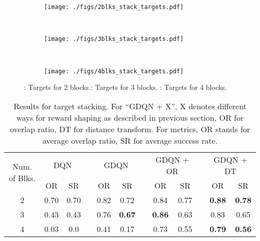 \documentclass{article} %
\begin{document}
\begin{figure}
    \centering
    \begin{subfigure}[b]{0.32\linewidth}
        \texttt{[image: ./figs/2blks\_stack\_targets.pdf]}
        \caption{}
        \label{fig:2blks_tgt_stack}
    \end{subfigure}
    ~ 
    \begin{subfigure}[b]{0.32\linewidth}
        \texttt{[image: ./figs/3blks\_stack\_targets.pdf]}
        \caption{}
        \label{fig:3blks_tgt_stack}
    \end{subfigure}
    ~ 
    \begin{subfigure}[b]{0.32\linewidth}
        \texttt{[image: ./figs/4blks\_stack\_targets.pdf]}
        \caption{}
        \label{fig:4blks_tgt_stack}
    \end{subfigure}
    \caption{\protect{}: Targets for $2$ blocks.\protect{}: Targets for $3$ blocks. \protect{}: Targets for $4$ blocks.}
    \label{fig:tgt_stack}
\end{figure}\begin{table}
\centering
\begin{tabular}{@{}clccccccccccc@{}}
\toprule
\multicolumn{2}{c}{\multirow{2}{*}{Num. of Blks.}} & \multicolumn{2}{c}{DQN} &  & \multicolumn{2}{c}{GDQN} &  & \multicolumn{2}{c}{GDQN + OR} &  & \multicolumn{2}{c}{GDQN + DT} \\ \cmidrule(lr){3-4} \cmidrule(lr){6-7} \cmidrule(lr){9-10} \cmidrule(l){12-13} 
\multicolumn{2}{c}{}                               & OR         & SR         &  & OR          & SR         &  & OR            & SR            &  & OR            & SR            \\ \midrule
\multicolumn{2}{c}{2}                              & 0.70          & 0.70          &  & 0.82           & 0.72          &  & 0.84             & 0.77             &  & {\bf 0.88}             & {\bf 0.78}             \\
\multicolumn{2}{c}{3}                              & 0.43          & 0.43          &  & 0.76           & {\bf 0.67}          &  & {\bf 0.86}             & 0.63             &  & 0.83             & 0.65             \\
\multicolumn{2}{c}{4}                              & 0.03          & 0.0          &  & 0.41           & 0.17          &  & 0.73             & 0.55             &  & {\bf 0.79}             & {\bf 0.56}             \\ \bottomrule
\end{tabular}
\caption{Results for target stacking. For ``GDQN + X'', X denotes different ways for reward shaping as described in previous section, OR for overlap ratio, DT for distance transform. For metrics, OR stands for average overlap ratio, SR for average success rate.}
\label{tab:tgt_stack}
\end{table}
\end{document}
